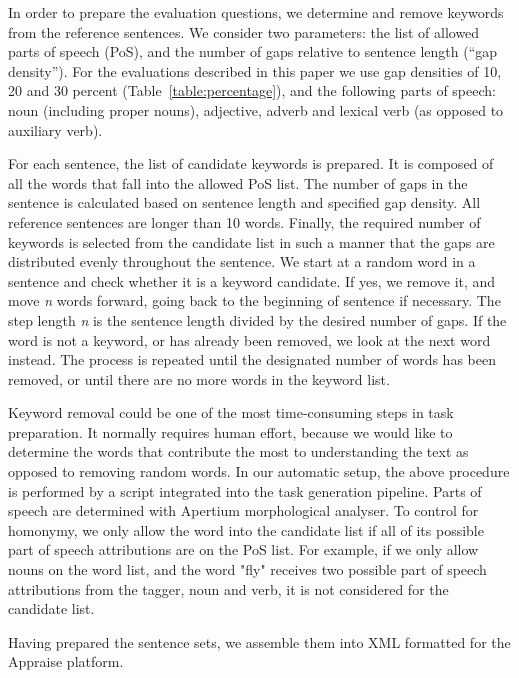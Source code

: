 \documentclass[11pt]{article}
\newcommand{\comment}[1]{}
\begin{document}
In order to prepare the evaluation questions, we determine and remove keywords from the 
reference sentences. We consider two parameters: the list of allowed parts of speech (PoS), and the 
number of gaps relative to sentence length (``gap density''). For the evaluations described in 
this paper we use gap densities of 10, 20 and 30 percent (Table~\ref{table:percentage}), and the following parts of speech: noun (including proper nouns), adjective, adverb and lexical verb (as opposed to auxiliary verb).

For each sentence, the list of candidate keywords is prepared. It is composed of all the words that 
fall into the allowed PoS list. The number of gaps in the sentence is calculated based on 
sentence length and specified gap density. All reference sentences are longer than 10 words. Finally, the required number of keywords is selected 
from the candidate list in such a manner that the gaps are distributed evenly throughout the sentence. We start at a random word in a sentence and check whether it is a keyword candidate. If yes, we remove it, and move \emph{n} words forward, going back to the beginning of sentence if necessary. The step length \emph{n} is the sentence length divided by the desired number of gaps. If the word is not a keyword, or has already been removed, we look at the next word instead. The process is repeated until the designated number of words has been removed, or until there are no more words in the keyword list.

Keyword removal could be one of the most time-consuming steps in task preparation. It normally requires human effort, because we would like to determine the words that contribute the most to understanding the text as opposed to removing random words. In our automatic setup, the above procedure is performed by a script integrated into the task generation pipeline. Parts of speech are determined with Apertium morphological analyser. To control for homonymy, we only allow the word into the candidate list if all of its possible part of speech attributions are on the PoS list. For example, if we only allow nouns on the word list, and the word "fly" receives two possible part of speech attributions from the tagger, noun and verb, it is not considered for the candidate list.

Having prepared the sentence sets, we assemble them into XML formatted for the Appraise platform.
\end{document}
